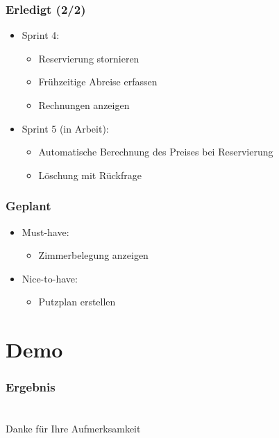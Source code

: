 \documentclass{beamer}
\begin{document}
\begin{frame}
\frametitle{Erledigt (2/2)} 
\begin{itemize}
\item  Sprint 4:
\begin{itemize}
\item  Reservierung stornieren
\item  Fr\"uhzeitige Abreise erfassen
\item  Rechnungen anzeigen
\end{itemize}
\item  Sprint 5 (in Arbeit):
\begin{itemize}
\item  Automatische Berechnung des Preises bei Reservierung
\item  L\"oschung mit R\"uckfrage
\end{itemize}
\end{itemize}
\end{frame}

\begin{frame}
\frametitle{Geplant} 
\begin{itemize}
\item  Must-have:
\begin{itemize}
\item  Zimmerbelegung anzeigen
\end{itemize}
\item  Nice-to-have:
\begin{itemize}
\item  Putzplan erstellen
\end{itemize}
\end{itemize}
\end{frame}

\section{Demo} 

\begin{frame}
\frametitle{Ergebnis} 
\begin{overprint}
\end{overprint}
\end{frame}

\section{} 

\begin{frame}
\begin{center}
Danke f\"ur Ihre Aufmerksamkeit
\end{center}
\end{frame}
\end{document}

